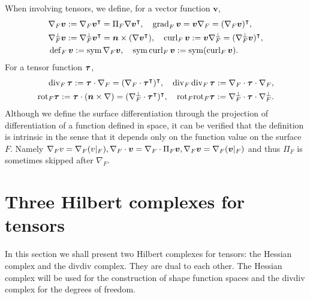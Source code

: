 When involving tensors, we define, for a vector function $\boldsymbol  v$,
\begin{align*}
&\nabla_F\boldsymbol  v:=\nabla_F\boldsymbol  v^{\intercal} = \Pi_F \nabla \boldsymbol  v^{\intercal}, \quad \operatorname{grad}_F \boldsymbol  v = \boldsymbol  v \nabla_F = (\nabla_F\boldsymbol  v)^{\intercal},\\
&\nabla_F^{\bot}\boldsymbol  v:=\nabla_F^{\bot}\boldsymbol  v^{\intercal} = \boldsymbol  n \times (\nabla \boldsymbol  v^{\intercal}), \quad \operatorname{curl}_F\boldsymbol  v:=\boldsymbol  v \nabla_F^{\bot} = ( \nabla_F^{\bot}\boldsymbol  v)^{\intercal},\\
&\operatorname{def}_{F}\boldsymbol  v:= \operatorname{sym} \nabla_F\boldsymbol  v, \quad \operatorname{sym}\operatorname{curl}_F\boldsymbol  v :=\operatorname{sym}(\operatorname{curl}_F\boldsymbol  v).
\end{align*}
For a tensor function $\boldsymbol\tau$,
\begin{align*}
\operatorname{div}_F\boldsymbol\tau:=\boldsymbol\tau\cdot\nabla_F = (\nabla_F\cdot \boldsymbol  \tau^{\intercal})^{\intercal},\quad \operatorname{div}_F\operatorname{div}_F\boldsymbol  \tau: = \nabla_F\cdot \boldsymbol\tau\cdot\nabla_F,\\
\text{rot}_F\boldsymbol\tau:=\boldsymbol\tau\cdot(\boldsymbol  n\times\nabla) = (\nabla_F^{\bot}\cdot \boldsymbol  \tau^{\intercal})^{\intercal} , \quad {\rm rot}_F{\rm rot}_F\boldsymbol  \tau: = \nabla_F^{\bot}\cdot \boldsymbol\tau\cdot\nabla_F^{\bot}.
\end{align*}
Although we define the surface differentiation through the projection of differentiation of a function defined in space, it can be verified that the definition is intrinsic in the sense that it depends only on the function value on the surface $F$. Namely $\nabla_F v = \nabla_F (v|_{F}), \nabla_F\cdot \boldsymbol v = \nabla_F \cdot \Pi_F \boldsymbol v, \nabla_F \boldsymbol v = \nabla_F(\boldsymbol v|_F)$ and thus $\Pi_F$ is sometimes skipped after $\nabla_F$. 



\section{Three Hilbert complexes for tensors}
In this section we shall present two Hilbert complexes for tensors: the Hessian complex and the divdiv complex. They are dual to each other. The Hessian complex will be used for the construction of shape function spaces and the divdiv complex for the degrees of freedom. 

